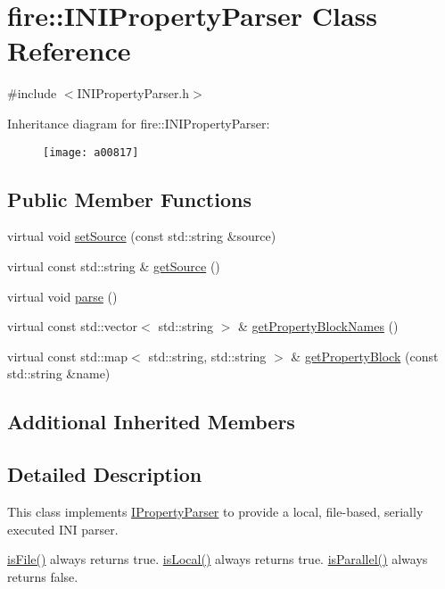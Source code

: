 \hypertarget{a00817}{}\section{fire\+:\+:I\+N\+I\+Property\+Parser Class Reference}
\label{a00817}


{\ttfamily \#include $<$I\+N\+I\+Property\+Parser.\+h$>$}

Inheritance diagram for fire\+:\+:I\+N\+I\+Property\+Parser\+:\begin{figure}[H]
\begin{center}
\leavevmode
\texttt{[image: a00817]}
\end{center}
\end{figure}
\subsection*{Public Member Functions}
\begin{DoxyCompactItemize}
\item 
virtual void \hyperlink{a00817_a06793909bc707a69d0c5772b14bc946d}{set\+Source} (const std\+::string \&source)
\item 
virtual const std\+::string \& \hyperlink{a00817_ad02c9a530f20a706d7bb2554813e8d3a}{get\+Source} ()
\item 
virtual void \hyperlink{a00817_a31b6bad01e65ed4bb5f1ba297616c641}{parse} ()
\item 
virtual const std\+::vector$<$ std\+::string $>$ \& \hyperlink{a00817_aed0f1f47111794659564dcddb4d25bc6}{get\+Property\+Block\+Names} ()
\item 
virtual const std\+::map$<$ std\+::string, std\+::string $>$ \& \hyperlink{a00817_a3591312590a66659ebd377cdde9ab9ad}{get\+Property\+Block} (const std\+::string \&name)
\end{DoxyCompactItemize}
\subsection*{Additional Inherited Members}


\subsection{Detailed Description}
This class implements \hyperlink{a00825}{I\+Property\+Parser} to provide a local, file-\/based, serially executed I\+NI parser.

\hyperlink{a00813_a091d5cf56bf8f407854ef87f460b2958}{is\+File()} always returns true. \hyperlink{a00813_a770acae6e216de3a9c7140a12de25d58}{is\+Local()} always returns true. \hyperlink{a00813_ad46898c516adcce38acbb4800dc9777b}{is\+Parallel()} always returns false.

